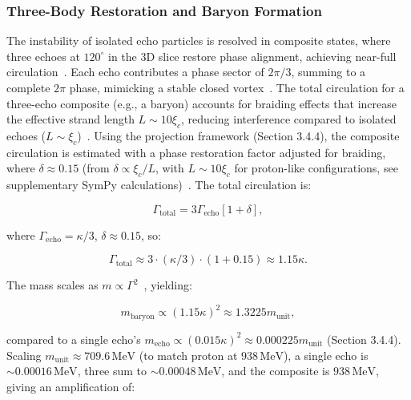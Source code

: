 \subsubsection{Three-Body Restoration and Baryon Formation}

The instability of isolated echo particles is resolved in composite states, where three echoes at \(120^\circ\) in the 3D slice restore phase alignment, achieving near-full circulation~\cite{Nitta2019}. Each echo contributes a phase sector of \(2\pi/3\), summing to a complete \(2\pi\) phase, mimicking a stable closed vortex~\cite{WikiFractional}. The total circulation for a three-echo composite (e.g., a baryon) accounts for braiding effects that increase the effective strand length \(L \sim 10 \xi_c\), reducing interference compared to isolated echoes (\(L \sim \xi_c\))~\cite{Wimmer2020}. Using the projection framework (Section 3.4.4), the composite circulation is estimated with a phase restoration factor adjusted for braiding, where \(\delta \approx 0.15\) (from \(\delta \propto \xi_c / L\), with \(L \sim 10 \xi_c\) for proton-like configurations, see supplementary SymPy calculations)~\cite{NatComm2023}. The total circulation is:

\begin{equation}
\Gamma_{\text{total}} = 3 \Gamma_{\text{echo}} \left[ 1 + \delta \right],
\end{equation}

where \(\Gamma_{\text{echo}} = \kappa/3\), \(\delta \approx 0.15\), so:

\begin{equation}
\Gamma_{\text{total}} \approx 3 \cdot \left( \kappa/3 \right) \cdot (1 + 0.15) \approx 1.15 \kappa.
\end{equation}

The mass scales as \(m \propto \Gamma^2\)~\cite{Lake2010}, yielding:

\begin{equation}
m_{\text{baryon}} \propto (1.15 \kappa)^2 \approx 1.3225 m_{\text{unit}},
\end{equation}

compared to a single echo's \(m_{\text{echo}} \propto (0.015 \kappa)^2 \approx 0.000225 m_{\text{unit}}\) (Section 3.4.4). Scaling \(m_{\text{unit}} \approx 709.6 \, \text{MeV}\) (to match proton at \(938 \, \text{MeV}\)), a single echo is \(\sim 0.00016 \, \text{MeV}\), three sum to \(\sim 0.00048 \, \text{MeV}\), and the composite is \(938 \, \text{MeV}\), giving an amplification of:

